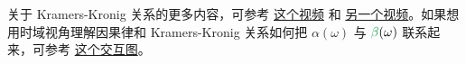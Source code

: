 关于 Kramers-Kronig 关系的更多内容，可参考 \href{https://www.youtube.com/watch?v=vzBnsG2rKWs}{这个视频} 和 \href{https://www.youtube.com/watch?v=rFTUTxPHYYw}{另一个视频}。如果想用时域视角理解因果律和 Kramers-Kronig 关系如何把 $\alpha(\omega)$ 与 $\betag(\omega)$ 联系起来，可参考 \href{https://www.desmos.com/calculator/1zymtgbbrv}{这个交互图}。
